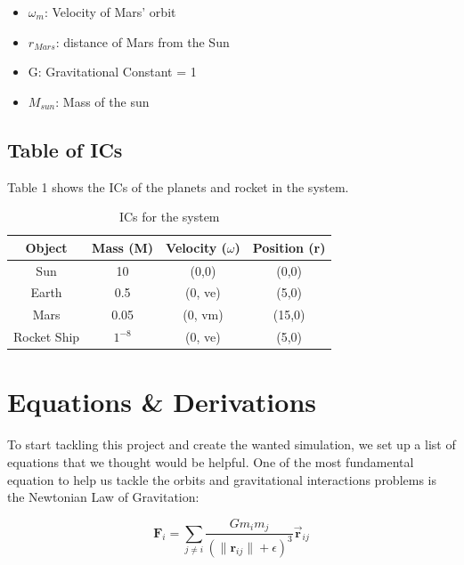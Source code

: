 \documentclass[12pt,a4paper,twocolumn,twoside]{tau-class/tau}
\begin{document}
\begin{itemize}
\item $\omega_m$: Velocity of Mars' orbit
\item $r_{Mars}$: distance of Mars from the Sun
\item G: Gravitational Constant = 1
\item $M_{sun}$: Mass of the sun
\end{itemize}


\subsection{Table of ICs}
    Table 1 shows the ICs of the planets and rocket in the system. 
    		
        \begin{table}[H]
    \centering
    \begin{tabular}{|c|c|c|c|}
        \hline
        Object & Mass (M) & Velocity ($\omega$) & Position (r)\\
        \hline
        Sun & 10 & (0,0) & (0,0)\\
        \hline
        Earth & 0.5 & (0, ve) & (5,0)\\
        \hline
        Mars & 0.05 & (0, vm) & (15,0)\\
        \hline
        Rocket Ship & $1^{-8}$ & (0, ve) & (5,0) \\
        \hline
    \end{tabular}
    \caption{ICs for the system}
    \label{tab:label_placeholder}
\end{table}
			
        
\section{Equations \& Derivations}

    To start tackling this project and create the wanted simulation, we set up a list of equations that we thought would be helpful. One of the most fundamental equation to help us tackle the orbits and gravitational interactions problems is the Newtonian Law of Gravitation: 
    

\begin{equation}
    \mathbf{F}_i = \sum_{j\neq i} \frac{Gm_im_j}{(\|\mathbf{r}_{ij}\| + \epsilon)^3} \mathbf{\vec{r}}_{ij}
      \label{eq:newtonian_gravitation}
\end{equation}
\end{document}
